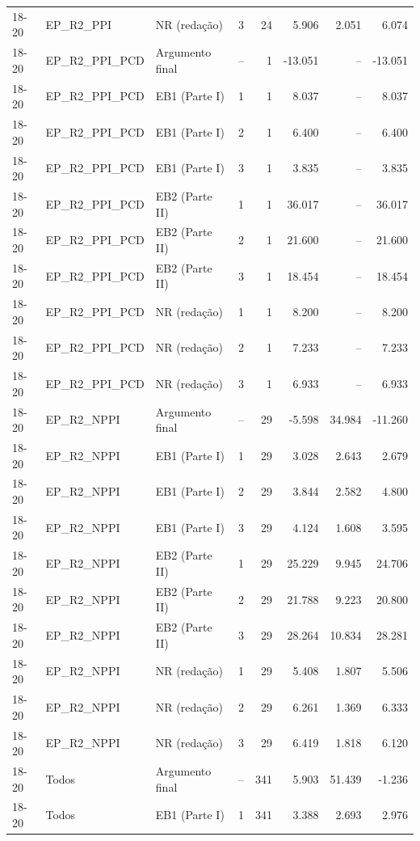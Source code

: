 \begin{longtable}{lllcrrrr}
18-20 & EP\_R2\_PPI & NR (redação) & 3 & 24 & 5.906 & 2.051 & 6.074 \\
18-20 & EP\_R2\_PPI\_PCD & Argumento final & -- & 1 & -13.051 & -- & -13.051 \\
18-20 & EP\_R2\_PPI\_PCD & EB1 (Parte I) & 1 & 1 & 8.037 & -- & 8.037 \\
18-20 & EP\_R2\_PPI\_PCD & EB1 (Parte I) & 2 & 1 & 6.400 & -- & 6.400 \\
18-20 & EP\_R2\_PPI\_PCD & EB1 (Parte I) & 3 & 1 & 3.835 & -- & 3.835 \\
18-20 & EP\_R2\_PPI\_PCD & EB2 (Parte II) & 1 & 1 & 36.017 & -- & 36.017 \\
18-20 & EP\_R2\_PPI\_PCD & EB2 (Parte II) & 2 & 1 & 21.600 & -- & 21.600 \\
18-20 & EP\_R2\_PPI\_PCD & EB2 (Parte II) & 3 & 1 & 18.454 & -- & 18.454 \\
18-20 & EP\_R2\_PPI\_PCD & NR (redação) & 1 & 1 & 8.200 & -- & 8.200 \\
18-20 & EP\_R2\_PPI\_PCD & NR (redação) & 2 & 1 & 7.233 & -- & 7.233 \\
18-20 & EP\_R2\_PPI\_PCD & NR (redação) & 3 & 1 & 6.933 & -- & 6.933 \\
18-20 & EP\_R2\_NPPI & Argumento final & -- & 29 & -5.598 & 34.984 & -11.260 \\
18-20 & EP\_R2\_NPPI & EB1 (Parte I) & 1 & 29 & 3.028 & 2.643 & 2.679 \\
18-20 & EP\_R2\_NPPI & EB1 (Parte I) & 2 & 29 & 3.844 & 2.582 & 4.800 \\
18-20 & EP\_R2\_NPPI & EB1 (Parte I) & 3 & 29 & 4.124 & 1.608 & 3.595 \\
18-20 & EP\_R2\_NPPI & EB2 (Parte II) & 1 & 29 & 25.229 & 9.945 & 24.706 \\
18-20 & EP\_R2\_NPPI & EB2 (Parte II) & 2 & 29 & 21.788 & 9.223 & 20.800 \\
18-20 & EP\_R2\_NPPI & EB2 (Parte II) & 3 & 29 & 28.264 & 10.834 & 28.281 \\
18-20 & EP\_R2\_NPPI & NR (redação) & 1 & 29 & 5.408 & 1.807 & 5.506 \\
18-20 & EP\_R2\_NPPI & NR (redação) & 2 & 29 & 6.261 & 1.369 & 6.333 \\
18-20 & EP\_R2\_NPPI & NR (redação) & 3 & 29 & 6.419 & 1.818 & 6.120 \\
18-20 & Todos & Argumento final & -- & 341 & 5.903 & 51.439 & -1.236 \\
18-20 & Todos & EB1 (Parte I) & 1 & 341 & 3.388 & 2.693 & 2.976 \\

\end{longtable}
